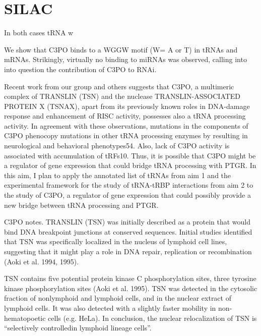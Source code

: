 \documentclass[12pt]{rockefeller}
\begin{document}
\section{SILAC}







In both cases tRNA w


	
	We show that C3PO binds to a WGGW motif (W= A or T) in tRNAs and mRNAs. Strikingly, 
	virtually no binding to miRNAs was observed, calling into into question the contribution
	of C3PO to RNAi. 
	

















Recent work from our group and others suggests that C3PO, a multimeric complex of TRANSLIN (TSN) and the nuclease TRANSLIN-ASSOCIATED PROTEIN X (TSNAX), apart from its previously known roles in DNA-damage response and enhancement of RISC activity, possesses also a tRNA processing activity. In agreement with these observations, mutations in the components of C3PO phenocopy mutations in other tRNA processing enzymes by resulting in neurological and behavioral phenotypes54. Also, lack of C3PO activity is associated with accumulation of tRFs10. Thus, it is possible that C3PO might be a regulator of gene expression that could bridge tRNA processing with PTGR. In this aim, I plan to apply the annotated list of tRNAs from aim 1 and the experimental framework for the study of tRNA-tRBP interactions from aim 2 to the study of C3PO, a regulator of gene expression that could possibly provide a new bridge between tRNA processing and PTGR. 

C3PO notes. TRANSLIN (TSN) was initially described as a protein that would bind DNA breakpoint junctions at conserved sequences. Initial studies identified that TSN was specifically localized in the nucleus of lymphoid cell lines, suggesting that it might play a role in DNA repair, replication or recombination (Aoki et al. 1994, 1995). 

TSN contains five potential protein kinase C phosphorylation sites, three tyrosine kinase phosphorylation sites (Aoki et al. 1995).
TSN was detected in the cytosolic fraction of nonlymphoid and lymphoid cells, and in the nuclear extract of lymphoid cells. It was also detected with a slightly faster mobility in non-hematopoetic cells (e.g. HeLa). 
In conclusion, the nuclear relocalization of TSN is “selectively controlledin lymphoid lineage cells”. 
\end{document}
